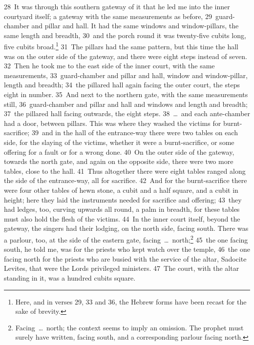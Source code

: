 \documentclass[10pt]{book} %
\begin{document}
\textcolor{benred8}{28}~It was through this southern gateway of it that he led me into the inner courtyard itself; a gateway with the same measurements as before, \textcolor{benred8}{29}~guard-chamber and pillar and hall. It had the same windows and window-pillars, the same length and breadth, \textcolor{benred8}{30}~and the porch round it was twenty-five cubits long, five cubits broad.\footnote[7]{Here, and in verses 29, 33 and 36, the Hebrew forms have been recast for the sake of brevity.} \textcolor{benred8}{31}~The pillars had the same pattern, but this time the hall was on the outer side of the gateway, and there were eight steps instead of seven. \textcolor{benred8}{32}~Then he took me to the east side of the inner court, with the same measurements, \textcolor{benred8}{33}~guard-chamber and pillar and hall, window and window-pillar, length and breadth; \textcolor{benred8}{34}~the pillared hall again facing the outer court, the steps eight in number. \textcolor{benred8}{35}~And next to the northern gate, with the same measurements still, \textcolor{benred8}{36}~guard-chamber and pillar and hall and windows and length and breadth; \textcolor{benred8}{37}~the pillared hall facing outwards, the eight steps.
\textcolor{benred8}{38}~\ldots\  and each ante-chamber had a door, between pillars. This was where they washed the victims for burnt-sacrifice; \textcolor{benred8}{39}~and in the hall of the entrance-way there were two tables on each side, for the slaying of the victims, whether it were a burnt-sacrifice, or some offering for a fault or for a wrong done. \textcolor{benred8}{40}~On the outer side of the gateway, towards the north gate, and again on the opposite side, there were two more tables, close to the hall. \textcolor{benred8}{41}~Thus altogether there were eight tables ranged along the side of the entrance-way, all for sacrifice. \textcolor{benred8}{42}~And for the burnt-sacrifice there were four other tables of hewn stone, a cubit and a half square, and a cubit in height; here they laid the instruments needed for sacrifice and offering; \textcolor{benred8}{43}~they had ledges, too, curving upwards all round, a palm in breadth, for these tables must also hold the flesh of the victims.
\textcolor{benred8}{44}~In the inner court itself, beyond the gateway, the singers had their lodging, on the north side, facing south. There was a parlour, too, at the side of the eastern gate, facing~\ldots\  north;\footnote[8]{\textasciigrave Facing\ \ldots\  north\textquotesingle ; the context seems to imply an omission. The prophet must surely have written, \textasciigrave facing south, and a corresponding parlour facing north\textquotesingle .} \textcolor{benred8}{45}~the one facing south, he told me, was for the priests who kept watch over the temple, \textcolor{benred8}{46}~the one facing north for the priests who are busied with the service of the altar, Sadocite Levites, that were the Lord\textquotesingle s privileged ministers. \textcolor{benred8}{47}~The court, with the altar standing in it, was a hundred cubits square.
\end{document}
